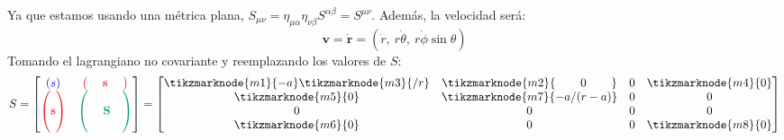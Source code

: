 \documentclass[]{article}
\numberwithin{equation}{section}
\newcommand{\0}{\textcolor{gray}{0}}
\newcommand{\rv}{\mathbf{r}}
\newcommand{\n}[1]{\mathbf{#1}}
\begin{document}
\begin{enumerate}
\begin{enumerate}
		
		Ya que estamos usando una métrica plana, \(S_{\mu\nu} = \eta_{\mu\alpha} \eta_{\nu\beta} S^{\alpha\beta} = S^{\mu\nu}\). Además, la velocidad será:
		\begin{equation*}
			\n{v} = \dot{\rv} = \left(\dot{r}, ~r\dot{\theta}, ~r\dot{\phi}\sin\theta\right)
		\end{equation*}
		Tomando el lagrangiano no covariante y reemplazando los valores de \(S\):
		\AddToShipoutPictureBG*{%
			\begin{tikzpicture}[overlay,remember picture,opacity=1,inner sep=4pt]
				\node[fill=azul, fit=(m1.center)(m3.center)]{};
				\node[fill=verde,fit=(m7.west)(m8.center)]{};
				\node[fill=rojo, fit=(m2.west)(m4.center)]{};
				\node[fill=rojo, fit=(m5.west)(m6.east)]{};
			\end{tikzpicture}
		}
		\begin{equation}
			S = \begin{bmatrix}
				\textcolor{blue}{(s)} & \textcolor{Red}{\begin{pmatrix}
					\phantom{.} & \n{s} & \phantom{.}
				\end{pmatrix}} \\
				\textcolor{Red}{\begin{pmatrix}
					\phantom{.} \\
					\n{s} \\
					\phantom{.}
				\end{pmatrix}} & \textcolor{Green}{\begin{pmatrix}
				& & \\
				& \n{S} & \\
				\phantom{.}
				\end{pmatrix}}
			\end{bmatrix} = \begin{bmatrix}
				\tikzmarknode{m1}{-a} \tikzmarknode{m3}{/r} & \tikzmarknode{m2}{\hspace{7.5mm} 0 \hspace{7.5mm}} & 0 & \tikzmarknode{m4}{0} \\
				\tikzmarknode{m5}{0} & \tikzmarknode{m7}{-a/(r-a)} & 0 & 0 \\
				0 & 0 & 0 & 0 \\
				\tikzmarknode{m6}{0} & 0 & 0 & \tikzmarknode{m8}{0}
			\end{bmatrix}
		\end{equation}
		

\end{enumerate}
\end{enumerate}
\end{document}
